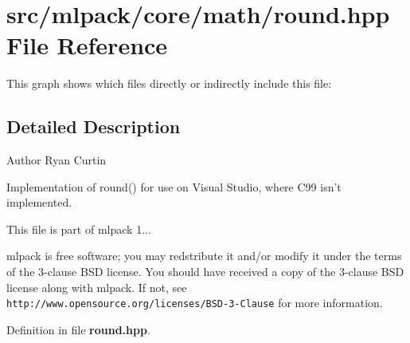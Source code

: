 \section{src/mlpack/core/math/round.hpp File Reference}
\label{round_8hpp}
This graph shows which files directly or indirectly include this file\-:


\subsection{Detailed Description}
\begin{DoxyAuthor}{Author}
Ryan Curtin
\end{DoxyAuthor}
Implementation of round() for use on Visual Studio, where C99 isn't implemented.

This file is part of mlpack 1...

mlpack is free software; you may redstribute it and/or modify it under the terms of the 3-\/clause B\-S\-D license. You should have received a copy of the 3-\/clause B\-S\-D license along with mlpack. If not, see {\tt http\-://www.\-opensource.\-org/licenses/\-B\-S\-D-\/3-\/\-Clause} for more information. 

Definition in file {\bf round.\-hpp}.

